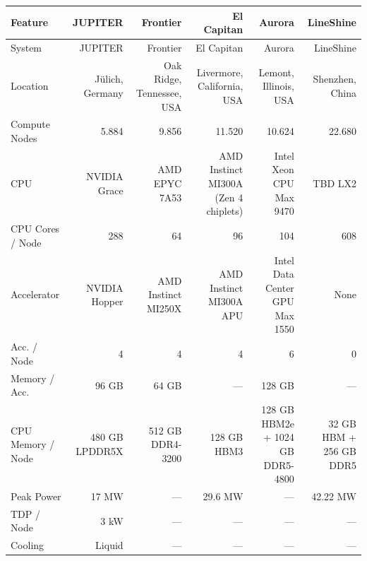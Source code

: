 \documentclass[border=6pt]{standalone}
\begin{document}
\begin{tabular}{
    L
  R
  R
  R
  R
  R
}
\toprule
\textbf{Feature}
  & \textbf{JUPITER}
  & \textbf{Frontier}
  & \textbf{El Capitan}
  & \textbf{Aurora}
  & \textbf{LineShine}
 \\
\midrule

System & JUPITER & Frontier & El Capitan & Aurora & LineShine \\

Location & Jülich, Germany & Oak Ridge, Tennessee, USA & Livermore, California, USA & Lemont, Illinois, USA & Shenzhen, China \\

Compute Nodes & \num{5,884} & \num{9,856} & \num{11,520} & \num{10,624} & \num{22,680} \\

CPU & NVIDIA Grace & AMD EPYC 7A53 & AMD Instinct MI300A (Zen 4 chiplets) & Intel Xeon CPU Max 9470 & TBD LX2 \\

CPU Cores / Node & \num{288} & \num{64} & \num{96} & \num{104} & \num{608} \\

Accelerator & NVIDIA Hopper & AMD Instinct MI250X & AMD Instinct MI300A APU & Intel Data Center GPU Max 1550 & None \\

Acc. / Node & \num{4} & \num{4} & \num{4} & \num{6} & 0 \\

Memory / Acc. & \num{96} GB & \num{64} GB & --- & \num{128} GB & --- \\

CPU Memory / Node & \num{480} GB LPDDR5X & \num{512} GB DDR4-3200 & \num{128} GB HBM3 & \num{128} GB HBM2e + \num{1024} GB DDR5-4800 & \num{32} GB HBM + \num{256} GB DDR5 \\

Peak Power & \num{17} MW & --- & \num{29.6} MW & --- & \num{42.22} MW \\

TDP / Node & \num{3} kW & --- & --- & --- & --- \\

Cooling & Liquid & --- & --- & --- & --- \\

\bottomrule
\end{tabular}
\end{document}
